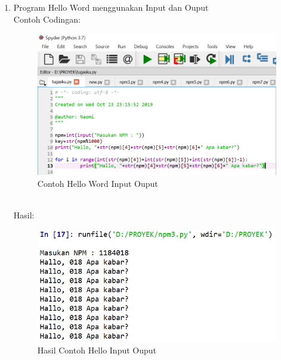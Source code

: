 \begin{enumerate}
    \newpage
    \item Program Hello Word menggunakan Input dan Ouput\\
    Contoh Codingan:
    \begin{figure}[!htbp]
    \centering
    \includegraphics[width=12cm]{gambar2/io.png}
    \caption{Contoh Hello Word Input Ouput}
    \end{figure}\\
    Hasil:
    \begin{figure}[!htbp]
    \centering
    \includegraphics[width=13cm]{gambar2/io1.png}
    \caption{Hasil Contoh Hello Input Ouput}
    \end{figure}
    

\end{enumerate}
